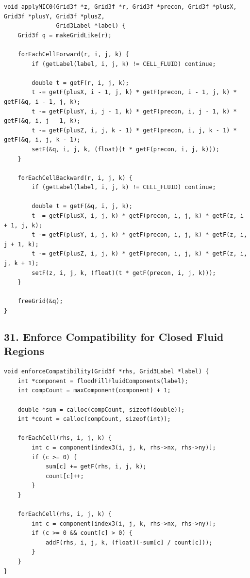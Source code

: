 \documentclass[10pt,letterpaper]{article}
\begin{document}
\begin{verbatim}
void applyMIC0(Grid3f *z, Grid3f *r, Grid3f *precon, Grid3f *plusX, Grid3f *plusY, Grid3f *plusZ,
               Grid3Label *label) {
    Grid3f q = makeGridLike(r);

    forEachCellForward(r, i, j, k) {
        if (getLabel(label, i, j, k) != CELL_FLUID) continue;

        double t = getF(r, i, j, k);
        t -= getF(plusX, i - 1, j, k) * getF(precon, i - 1, j, k) * getF(&q, i - 1, j, k);
        t -= getF(plusY, i, j - 1, k) * getF(precon, i, j - 1, k) * getF(&q, i, j - 1, k);
        t -= getF(plusZ, i, j, k - 1) * getF(precon, i, j, k - 1) * getF(&q, i, j, k - 1);
        setF(&q, i, j, k, (float)(t * getF(precon, i, j, k)));
    }

    forEachCellBackward(r, i, j, k) {
        if (getLabel(label, i, j, k) != CELL_FLUID) continue;

        double t = getF(&q, i, j, k);
        t -= getF(plusX, i, j, k) * getF(precon, i, j, k) * getF(z, i + 1, j, k);
        t -= getF(plusY, i, j, k) * getF(precon, i, j, k) * getF(z, i, j + 1, k);
        t -= getF(plusZ, i, j, k) * getF(precon, i, j, k) * getF(z, i, j, k + 1);
        setF(z, i, j, k, (float)(t * getF(precon, i, j, k)));
    }

    freeGrid(&q);
}
\end{verbatim}

\subsection*{31. Enforce Compatibility for Closed Fluid Regions}

\begin{verbatim}
void enforceCompatibility(Grid3f *rhs, Grid3Label *label) {
    int *component = floodFillFluidComponents(label);
    int compCount = maxComponent(component) + 1;

    double *sum = calloc(compCount, sizeof(double));
    int *count = calloc(compCount, sizeof(int));

    forEachCell(rhs, i, j, k) {
        int c = component[index3(i, j, k, rhs->nx, rhs->ny)];
        if (c >= 0) {
            sum[c] += getF(rhs, i, j, k);
            count[c]++;
        }
    }

    forEachCell(rhs, i, j, k) {
        int c = component[index3(i, j, k, rhs->nx, rhs->ny)];
        if (c >= 0 && count[c] > 0) {
            addF(rhs, i, j, k, (float)(-sum[c] / count[c]));
        }
    }
}
\end{verbatim}
\end{document}
